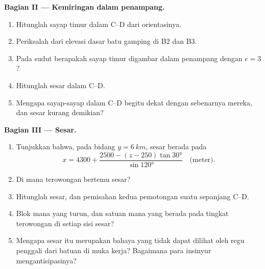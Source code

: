 \begin{problem}
\medskip
\noindent\textbf{Bagian II --- Kemiringan dalam penampang.}
\begin{enumerate}[resume]
  \item Hitunglah  sayap timur dalam C--D dari orientasinya.
  \item Periksalah dari elevasi dasar batu gamping di B2 dan B3.
  \item Pada sudut berapakah sayap timur digambar dalam penampang dengan $e = 3$?
  \item Hitunglah  sesar dalam C--D.
  \item Mengapa  sayap-sayap dalam C--D begitu dekat dengan  sebenarnya mereka, dan  sesar kurang demikian?
\end{enumerate}

\medskip
\noindent\textbf{Bagian III --- Sesar.}
\begin{enumerate}[resume]
  \item Tunjukkan bahwa, pada bidang $y = \qty{6}{km}$, sesar berada pada
        \[ x = 4300 + \frac{2500 - (z - 250)\tan\ang{30}}{\sin\ang{120}}
           \quad\text{(meter)}. \]
  \item Di mana terowongan bertemu sesar?
  \item Hitunglah  sesar, dan pemisahan kedua pemotongan suatu  sepanjang C--D.
  \item Blok mana yang turun, dan satuan mana yang berada pada tingkat terowongan di setiap sisi sesar?
  \item Mengapa sesar itu merupakan bahaya yang tidak dapat dilihat oleh regu penggali dari batuan di muka kerja? Bagaimana para insinyur mengantisipasinya?
\end{enumerate}


\end{problem}
